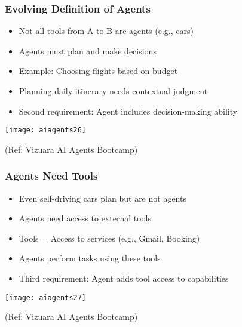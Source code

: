\begin{frame}[fragile]\frametitle{Evolving Definition of Agents}

      \begin{itemize}
		\item Not all tools from A to B are agents (e.g., cars)
		\item Agents must plan and make decisions
		\item Example: Choosing flights based on budget
		\item Planning daily itinerary needs contextual judgment
		\item Second requirement: Agent includes decision-making ability
      \end{itemize}

		\begin{center}
		\texttt{[image: aiagents26]}
		
		{\tiny (Ref: Vizuara AI Agents Bootcamp)}
		\end{center}	

\end{frame}

\begin{frame}[fragile]\frametitle{Agents Need Tools}

      \begin{itemize}
        \item Even self-driving cars plan but are not agents
        \item Agents need access to external tools
        \item Tools = Access to services (e.g., Gmail, Booking)
        \item Agents perform tasks using these tools
        \item Third requirement: Agent adds tool access to capabilities
      \end{itemize}

		\begin{center}
		\texttt{[image: aiagents27]}
		
		{\tiny (Ref: Vizuara AI Agents Bootcamp)}
		\end{center}	

\end{frame}

